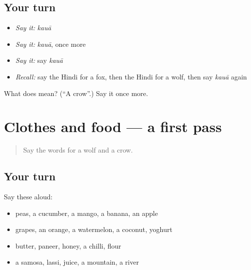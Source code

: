 \subsection*{Your turn}
\begin{itemize}
\raggedright
  \item \emph{Say it:} \emph{kauā}
  \item \emph{Say it:} \emph{kauā}, once more
  \item \emph{Say it:} say \emph{kauā}
  \item \emph{Recall:} say the Hindi for a fox, then the Hindi for a wolf, then say \emph{kauā} again
\end{itemize}

\begin{tcolorbox}[breakable,colback=teal!4,colframe=teal!35!black,title={Before you move on}]
What does  mean? (\textquotedblleft{}A crow\textquotedblright{}.) Say it once more.
\end{tcolorbox}
\section[(dialogue)]{Clothes and food — a first pass}

\label{lesson:HI-R147-first-pass-clothes-and-food}



\begin{quote}
Say the words for a wolf and a crow.
\end{quote}

\subsection*{Your turn}
Say these aloud:

\begin{itemize}
\raggedright
  \item peas, a cucumber, a mango, a banana, an apple
  \item grapes, an orange, a watermelon, a coconut, yoghurt
  \item butter, paneer, honey, a chilli, flour
  \item a samosa, lassi, juice, a mountain, a river
\end{itemize}

